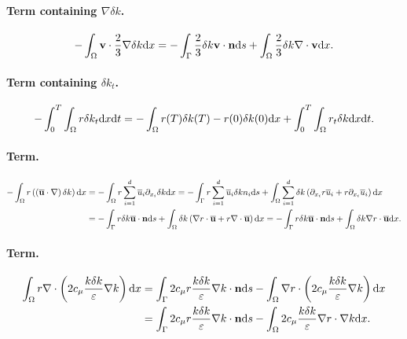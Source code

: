 \documentclass[oneside,11pt]{book}
\numberwithin{equation}{section}
\begin{document}
\paragraph*{Term containing $\nabla\delta k$.}
\begin{align*}
    -\int_\Omega {\bf v}\cdot\frac{2}{3}\nabla\delta k{\rm d}x = - \int_\Gamma \frac{2}{3}\delta k{\bf v}\cdot{\bf n}{\rm d}s + \int_\Omega \frac{2}{3}\delta k\nabla\cdot{\bf v}{\rm d}x.
\end{align*}
\paragraph*{Term containing $\delta k_t$.}
\begin{align*}
    -\int_0^T\int_\Omega r\delta k_t{\rm d}x{\rm d}t = -\int_\Omega r(T)\delta k(T) - r(0)\delta k(0){\rm d}x + \int_0^T\int_\Omega r_t\delta k{\rm d}x{\rm d}t.
\end{align*}
\paragraph*{Term.}
\begin{align*}
    -\int_\Omega r\left(\left(\overline{\bf u}\cdot\nabla\right)\delta k\right){\rm d}x &= -\int_\Omega r\sum_{i=1}^d \overline{u}_i\partial_{x_i}\delta k{\rm d}x = -\int_\Gamma r\sum_{i=1}^d \overline{u}_i\delta kn_i{\rm d}s + \int_\Omega \sum_{i=1}^d \delta k\left(\partial_{x_i}r\overline{u}_i + r\partial_{x_i}\overline{u}_i\right){\rm d}x\\
    &= -\int_\Gamma r\delta k\overline{\bf u}\cdot{\bf n}{\rm d}s + \int_\Omega \delta k\left(\nabla r\cdot\overline{\bf u} + r\nabla\cdot\overline{\bf u}\right){\rm d}x = -\int_\Gamma r\delta k\overline{\bf u}\cdot{\bf n}{\rm d}s + \int_\Omega \delta k\nabla r\cdot\overline{\bf u}{\rm d}x.
\end{align*}
\paragraph*{Term.}
\begin{align*}
    \int_\Omega r\nabla\cdot\left(2c_\mu\frac{k\delta k}{\varepsilon}\nabla k\right){\rm d}x &= \int_\Gamma 2c_\mu r\frac{k\delta k}{\varepsilon}\nabla k\cdot{\bf n}{\rm d}s - \int_\Omega \nabla r\cdot\left(2c_\mu\frac{k\delta k}{\varepsilon}\nabla k\right){\rm d}x\\
    &= \int_\Gamma 2c_\mu r\frac{k\delta k}{\varepsilon}\nabla k\cdot{\bf n}{\rm d}s - \int_\Omega 2c_\mu\frac{k\delta k}{\varepsilon}\nabla r\cdot\nabla k{\rm d}x.
\end{align*}
\end{document}
